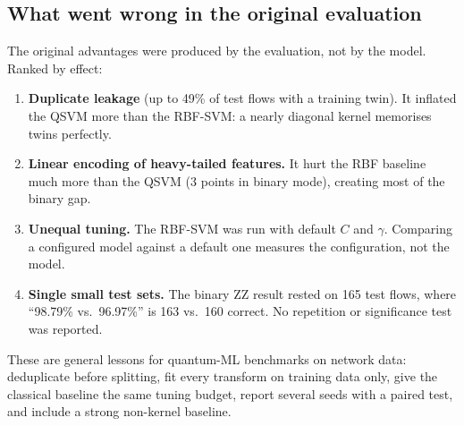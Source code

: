 \subsection{What went wrong in the original evaluation}
The original advantages were produced by the evaluation, not by the model. Ranked by effect:
\begin{enumerate}
\item \textbf{Duplicate leakage} (up to 49\% of test flows with a training twin). It inflated the
      QSVM more than the RBF-SVM: a nearly diagonal kernel memorises twins perfectly.
\item \textbf{Linear encoding of heavy-tailed features.} It hurt the RBF baseline much more than
      the QSVM (3 points in binary mode), creating most of the binary gap.
\item \textbf{Unequal tuning.} The RBF-SVM was run with default $C$ and $\gamma$. Comparing a
      configured model against a default one measures the configuration, not the model.
\item \textbf{Single small test sets.} The binary ZZ result rested on 165 test flows, where
      ``98.79\% vs.\ 96.97\%'' is 163 vs.\ 160 correct. No repetition or significance test was
      reported.
\end{enumerate}
These are general lessons for quantum-ML benchmarks on network data: deduplicate before
splitting, fit every transform on training data only, give the classical baseline the same
tuning budget, report several seeds with a paired test, and include a strong non-kernel
baseline.

